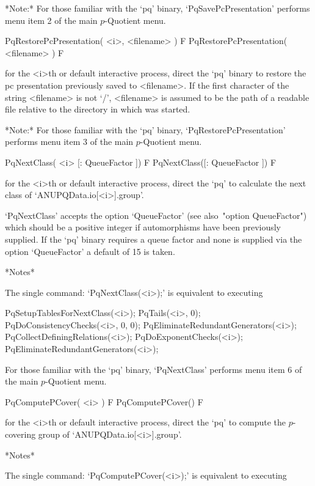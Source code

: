 *Note:* For those familiar with the `pq'  binary,  `PqSavePcPresentation'
performs menu item 2 of the main $p$-Quotient menu.

\>PqRestorePcPresentation( <i>, <filename> ) F
\>PqRestorePcPresentation( <filename> ) F

for the <i>th or default interactive {\ANUPQ} process,  direct  the  `pq'
binary to restore the pc presentation previously saved to <filename>.  If
the first character of the string <filename> is not  `/',  <filename>  is
assumed to be the path of a readable file relative to  the  directory  in
which {\GAP} was started.

*Note:*
For  those  familiar  with  the  `pq'  binary,  `PqRestorePcPresentation'
performs menu item 3 of the main $p$-Quotient menu.

\>PqNextClass( <i> [: QueueFactor ]) F
\>PqNextClass([: QueueFactor ]) F

for the <i>th or default interactive {\ANUPQ} process, direct the `pq' to
calculate the next class of `ANUPQData.io[<i>].group'.

`PqNextClass'  accepts  the  option   `QueueFactor'   (see   also~"option
QueueFactor") which should be a positive integer  if  automorphisms  have
been previously supplied. If the `pq' binary requires a queue factor  and
none is supplied via the option `QueueFactor' a default of 15 is taken.

*Notes*

The single command: `PqNextClass(<i>);' is equivalent to executing

PqSetupTablesForNextClass(<i>);
PqTails(<i>, 0);
PqDoConsistencyChecks(<i>, 0, 0);
PqEliminateRedundantGenerators(<i>);
PqCollectDefiningRelations(<i>);
PqDoExponentChecks(<i>);
PqEliminateRedundantGenerators(<i>);

For those familiar with the `pq' binary, `PqNextClass' performs menu item
6 of the main $p$-Quotient menu.

\>PqComputePCover( <i> ) F
\>PqComputePCover() F

for the <i>th or default interactive {\ANUPQ} process, direct the `pq' to
compute the $p$-covering group of `ANUPQData.io[<i>].group'.

*Notes*

The single command: `PqComputePCover(<i>);' is equivalent to executing

